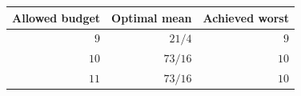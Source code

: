 \begin{tabular}{@{}rrr@{}}
\toprule
Allowed budget & Optimal mean & Achieved worst \\
\midrule
$9$ & $21/4$ & $9$ \\
$10$ & $73/16$ & $10$ \\
$11$ & $73/16$ & $10$ \\
\bottomrule
\end{tabular}
